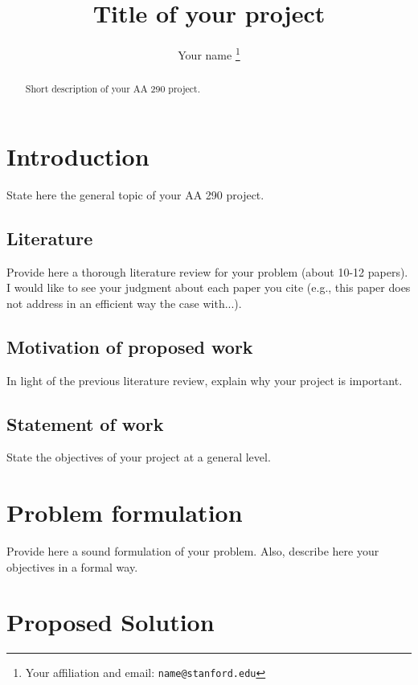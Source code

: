 \documentclass[letterpaper, 10 pt, conference]{ieeeconf}  %
\title{\LARGE \bf
Title of your project
}
\author{Your name%
\thanks{Your affiliation and email:
        {\tt\small name@stanford.edu}}%
}
\begin{document}
\maketitle
\thispagestyle{empty}
\pagestyle{empty}


\begin{abstract}

Short description of your AA 290 project.

\end{abstract}


\section{Introduction}

State here the general topic of your AA 290 project.

\subsection{Literature}

Provide here a thorough literature review for your problem (about 10-12 papers).  I would like to see your judgment about each paper you cite (e.g., this paper does not address in an efficient way the case with...).

\subsection{Motivation of proposed work} 
In light of the previous literature review, explain why your project is important.

\subsection{Statement of work} 
State the objectives of your project at a general level.




\section{Problem formulation}
Provide here a sound formulation of your problem. Also, describe here your objectives in a formal way.

\section{Proposed Solution}
\end{document}
